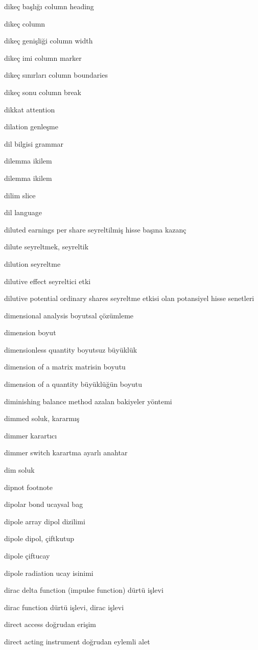\documentclass[12pt,fleqn]{article}\usepackage{../../common}
\begin{document}
dikeç başlığı column heading

dikeç column

dikeç genişliği column width

dikeç imi column marker

dikeç sınırları column boundaries

dikeç sonu column break

dikkat attention

dilation genleşme

dil bilgisi grammar

dilemma ikilem

dilemma ikilem

dilim slice

dil language

diluted earnings per share seyreltilmiş hisse başına kazanç

dilute seyreltmek, seyreltik

dilution seyreltme

dilutive effect seyreltici etki

dilutive potential ordinary shares seyreltme etkisi olan potansiyel hisse senetleri

dimensional analysis boyutsal çözümleme

dimension boyut

dimensionless quantity boyutsuz büyüklük

dimension of a matrix matrisin boyutu

dimension of a quantity büyüklüğün boyutu

diminishing balance method azalan bakiyeler yöntemi

dimmed soluk, kararmış

dimmer karartıcı

dimmer switch karartma ayarlı anahtar

dim soluk

dipnot footnote

dipolar bond ucaysal bag

dipole array dipol dizilimi

dipole dipol, çiftkutup

dipole çiftucay

dipole radiation ucay isinimi

dirac delta function (impulse function) dürtü işlevi

dirac function dürtü işlevi, dirac işlevi

direct access doğrudan erişim

direct acting instrument doğrudan eylemli alet
\end{document}
